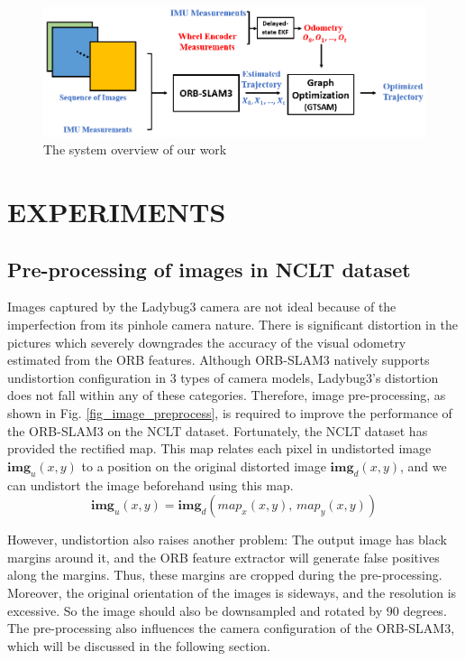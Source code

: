 \documentclass[letterpaper, 10 pt, conference]{ieeeconf}  %
\begin{document}
\begin{figure}
\centering
\includegraphics[scale=0.8]{System.PNG}
\caption{The system overview of our work}
\label{fig_system}
\end{figure}

\section{EXPERIMENTS}

\subsection{Pre-processing of images in NCLT dataset} 
Images captured by the Ladybug3 camera are not ideal because of the imperfection from its pinhole camera nature. There is significant distortion in the pictures which severely downgrades the accuracy of the visual odometry estimated from the ORB features. Although ORB-SLAM3 natively supports undistortion configuration in 3 types of camera models, Ladybug3's distortion does not fall within any of these categories. Therefore, image pre-processing, as shown in Fig. \ref{fig_image_preprocess},  is required to improve the performance of the ORB-SLAM3 on the NCLT dataset. Fortunately, the NCLT dataset has provided the rectified map. This map relates each pixel in undistorted image $\mathbf{img}_{\textit{u}}(x,y)$ to a position on the original distorted image $\mathbf{img}_{\textit{d}}(x,y)$, and we can undistort the image beforehand using this map.
\begin{equation}
\mathbf{img}_{\textit{u}}(x,y)=\mathbf{img}_{\textit{d}}(map_x(x,y),\,map_y(x,y))
\end{equation}


However, undistortion also raises another problem: The output image has black margins around it, and the ORB feature extractor will generate false positives along the margins. Thus, these margins are cropped during the pre-processing. Moreover, the original orientation of the images is sideways, and the resolution is excessive. So the image should also be downsampled and rotated by 90 degrees. The pre-processing also influences the camera configuration of the ORB-SLAM3, which will be discussed in the following section.
\end{document}
